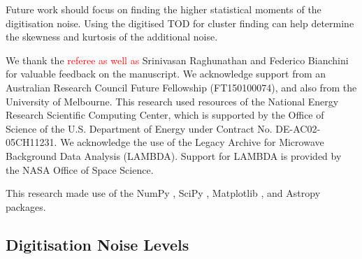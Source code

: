 \documentclass[apj]{emulateapj}
\newcommand{\changed}[1]{\textcolor{Red}{#1}}
\begin{document}
Future work should focus on finding the higher statistical moments of the digitisation noise. Using the digitised TOD for cluster finding can help determine the skewness and kurtosis of the additional noise.

\acknowledgments %


We thank the \changed{referee as well as} Srinivasan Raghunathan and Federico Bianchini for valuable feedback on the manuscript. 
We acknowledge support from an Australian Research Council Future Fellowship (FT150100074), and also from the University of Melbourne. 
This research used resources of the National Energy Research Scientific Computing Center, which is supported by the Office of Science of the U.S. Department of Energy under Contract No. DE-AC02-05CH11231. 
We acknowledge the use of the Legacy Archive for Microwave Background Data Analysis (LAMBDA). Support for LAMBDA is provided by the NASA Office of Space Science.


This research made use of the NumPy \citep{numpy}, SciPy \citep{scipy}, Matplotlib \citep{matplotlib}, and Astropy \citep{astropy} packages.

\newpage

\appendix

\subsection{Digitisation Noise Levels}
\label{subsec:appendixnoisetables}
\end{document}
